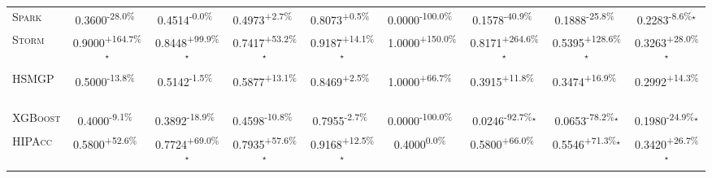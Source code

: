 \begin{table}[htbp]
\begin{tabular}{l|cccc|cccc}
\textsc{Spark} & \cellcolor{red!30}0.3600\textsuperscript{-28.0\%}$^{\,\,\,}$ & \cellcolor{red!30}0.4514\textsuperscript{-0.0\%}$^{\,\,\,}$ & \cellcolor{green!30}0.4973\textsuperscript{+2.7\%}$^{\,\,\,}$ & \cellcolor{green!30}0.8073\textsuperscript{+0.5\%}$^{\,\,\,}$ & \cellcolor{red!30}0.0000\textsuperscript{-100.0\%}$^{\,\,\,}$ & \cellcolor{red!30}0.1578\textsuperscript{-40.9\%}$^{\,\,\,}$ & \cellcolor{red!30}0.1888\textsuperscript{-25.8\%}$^{\,\,\,}$ & \cellcolor{red!30}0.2283\textsuperscript{-8.6\%}$^\star$ \\
\textsc{Storm} & \cellcolor{green!30}0.9000\textsuperscript{+164.7\%}$^\star$ & \cellcolor{green!30}0.8448\textsuperscript{+99.9\%}$^\star$ & \cellcolor{green!30}0.7417\textsuperscript{+53.2\%}$^\star$ & \cellcolor{green!30}0.9187\textsuperscript{+14.1\%}$^\star$ & \cellcolor{green!30}1.0000\textsuperscript{+150.0\%}$^{\,\,\,}$ & \cellcolor{green!30}0.8171\textsuperscript{+264.6\%}$^\star$ & \cellcolor{green!30}0.5395\textsuperscript{+128.6\%}$^\star$ & \cellcolor{green!30}0.3263\textsuperscript{+28.0\%}$^\star$ \\
\textsc{HSMGP} & \cellcolor{red!30}0.5000\textsuperscript{-13.8\%}$^{\,\,\,}$ & \cellcolor{red!30}0.5142\textsuperscript{-1.5\%}$^{\,\,\,}$ & \cellcolor{green!30}0.5877\textsuperscript{+13.1\%}$^{\,\,\,}$ & \cellcolor{green!30}0.8469\textsuperscript{+2.5\%}$^{\,\,\,}$ & \cellcolor{green!30}1.0000\textsuperscript{+66.7\%}$^{\,\,\,}$ & \cellcolor{green!30}0.3915\textsuperscript{+11.8\%}$^{\,\,\,}$ & \cellcolor{green!30}0.3474\textsuperscript{+16.9\%}$^{\,\,\,}$ & \cellcolor{green!30}0.2992\textsuperscript{+14.3\%}$^{\,\,\,}$ \\
\textsc{XGBoost} & \cellcolor{red!30}0.4000\textsuperscript{-9.1\%}$^{\,\,\,}$ & \cellcolor{red!30}0.3892\textsuperscript{-18.9\%}$^{\,\,\,}$ & \cellcolor{red!30}0.4598\textsuperscript{-10.8\%}$^{\,\,\,}$ & \cellcolor{red!30}0.7955\textsuperscript{-2.7\%}$^{\,\,\,}$ & \cellcolor{red!30}0.0000\textsuperscript{-100.0\%}$^{\,\,\,}$ & \cellcolor{red!30}0.0246\textsuperscript{-92.7\%}$^\star$ & \cellcolor{red!30}0.0653\textsuperscript{-78.2\%}$^\star$ & \cellcolor{red!30}0.1980\textsuperscript{-24.9\%}$^\star$ \\
\textsc{HIPAcc} & \cellcolor{green!30}0.5800\textsuperscript{+52.6\%}$^{\,\,\,}$ & \cellcolor{green!30}0.7724\textsuperscript{+69.0\%}$^\star$ & \cellcolor{green!30}0.7935\textsuperscript{+57.6\%}$^\star$ & \cellcolor{green!30}0.9168\textsuperscript{+12.5\%}$^\star$ & \cellcolor{red!30}0.4000\textsuperscript{0.0\%}$^{\,\,\,}$ & \cellcolor{green!30}0.5800\textsuperscript{+66.0\%}$^{\,\,\,}$ & \cellcolor{green!30}0.5546\textsuperscript{+71.3\%}$^\star$ & \cellcolor{green!30}0.3420\textsuperscript{+26.7\%}$^\star$ \\

\end{tabular}
\end{table}
